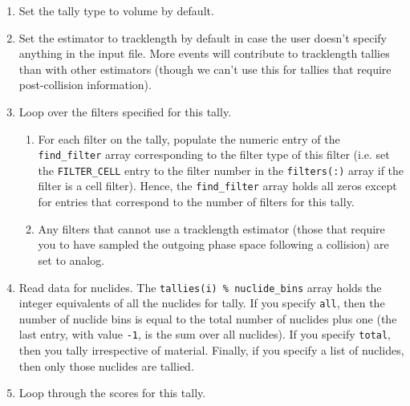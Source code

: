 \documentclass[10pt]{article}
\numberwithin{equation}{section} %
\begin{document}
\begin{enumerate}
\begin{enumerate}
	\item Set the tally type to volume by default. 
	\item Set the estimator to tracklength by default in case the user doesn't specify anything in the input file. More events will contribute to tracklength tallies than with other estimators (though we can't use this for tallies that require post-collision information).
	\item Loop over the filters specified for this tally.	
		\begin{enumerate}
		\item For each filter on the tally, populate the numeric entry of the {\tt find\_filter} array corresponding to the filter type of this filter (i.e. set the {\tt FILTER\_CELL} entry to the filter number in the {\tt filters(:)} array if the filter is a cell filter). Hence, the {\tt find\_filter} array holds all zeros except for entries that correspond to the number of filters for this tally.
		\item Any filters that cannot use a tracklength estimator (those that require you to have sampled the outgoing phase space following a collision) are set to analog.
		\end{enumerate}
	\item Read data for nuclides. The {\tt tallies(i) \% nuclide\_bins} array holds the integer equivalents of all the nuclides for tally. If you specify {\tt all}, then the number of nuclide bins is equal to the total number of nuclides plus one (the last entry, with value {\tt -1}, is the sum over all nuclides). If you specify {\tt total}, then you tally irrespective of material. Finally, if you specify a list of nuclides, then only those nuclides are tallied.
	\item Loop through the scores for this tally.
		

\end{enumerate}
\end{enumerate}
\end{document}
